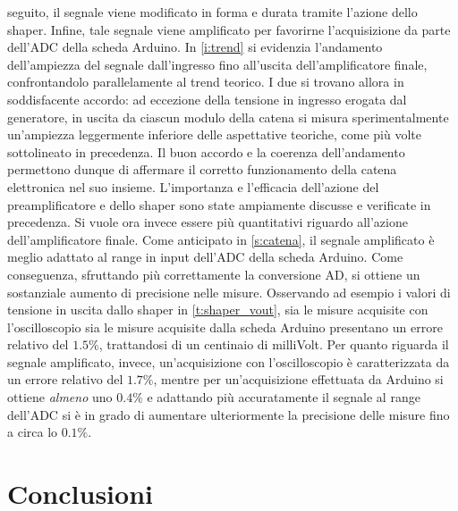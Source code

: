 \documentclass[a4paper,11pt]{article} %
\begin{document}
seguito, il segnale viene modificato in forma e durata tramite l'azione dello shaper. Infine, tale segnale viene
amplificato per favorirne l'acquisizione da parte dell'ADC della scheda Arduino. In \autoref{i:trend} si evidenzia
l'andamento dell'ampiezza del segnale dall'ingresso fino all'uscita dell'amplificatore finale, confrontandolo
parallelamente al trend teorico. I due si trovano allora in soddisfacente accordo: ad eccezione della tensione in
ingresso erogata dal generatore, in uscita da ciascun modulo della catena si misura sperimentalmente un'ampiezza
leggermente inferiore delle aspettative teoriche, come più volte sottolineato in precedenza. Il buon accordo e la
coerenza dell'andamento permettono dunque di affermare il corretto funzionamento della catena elettronica nel suo
insieme. L'importanza e l'efficacia dell'azione del preamplificatore e dello shaper sono state ampiamente discusse e
verificate in precedenza. Si vuole ora invece essere più quantitativi riguardo all'azione dell'amplificatore finale.
Come anticipato in \autoref{s:catena}, il segnale amplificato è meglio adattato al range in input dell'ADC della scheda
Arduino. Come conseguenza, sfruttando più correttamente la conversione AD, si ottiene un sostanziale aumento di
precisione nelle misure. Osservando ad esempio i valori di tensione in uscita dallo shaper in \autoref{t:shaper_vout},
sia le misure acquisite con l'oscilloscopio sia le misure acquisite dalla scheda Arduino presentano un errore relativo
del $1.5\%$, trattandosi di un centinaio di milliVolt. Per quanto riguarda il segnale amplificato, invece,
un'acquisizione con l'oscilloscopio è caratterizzata da un errore relativo del $1.7\%$, mentre per un'acquisizione
effettuata da Arduino si ottiene \textit{almeno} uno $0.4\%$ e adattando più accuratamente il segnale al range dell'ADC
si è in grado di aumentare ulteriormente la precisione delle misure fino a circa lo $0.1\%$. 



\section{Conclusioni}\label{s:conclusioni}
\end{document}
